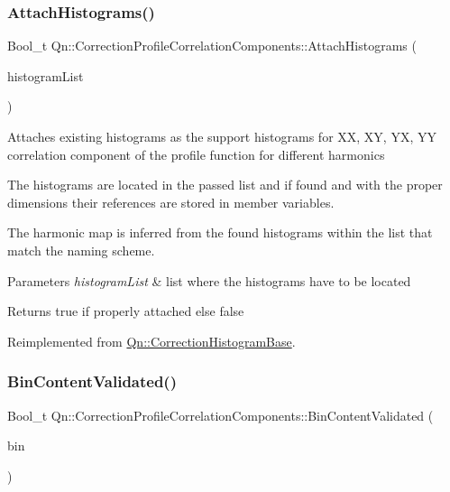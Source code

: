 \subsubsection{\texorpdfstring{Attach\+Histograms()}{AttachHistograms()}}
{\footnotesize\ttfamily Bool\+\_\+t Qn\+::\+Correction\+Profile\+Correlation\+Components\+::\+Attach\+Histograms (\begin{DoxyParamCaption}\item[{T\+List $\ast$}]{histogram\+List }\end{DoxyParamCaption})\hspace{0.3cm}{\ttfamily [virtual]}}

Attaches existing histograms as the support histograms for XX, XY, YX, YY correlation component of the profile function for different harmonics

The histograms are located in the passed list and if found and with the proper dimensions their references are stored in member variables.

The harmonic map is inferred from the found histograms within the list that match the naming scheme.


\begin{DoxyParams}{Parameters}
{\em histogram\+List} & list where the histograms have to be located \\
\hline
\end{DoxyParams}
\begin{DoxyReturn}{Returns}
true if properly attached else false 
\end{DoxyReturn}


Reimplemented from \mbox{\hyperlink{classQn_1_1CorrectionHistogramBase_ad8bcd0079fe5db561780a522e46b7b16}{Qn\+::\+Correction\+Histogram\+Base}}.

\mbox{\label{classQn_1_1CorrectionProfileCorrelationComponents_a10db27a0f3bc8c52b3b188eb7395f835}} 
\subsubsection{\texorpdfstring{Bin\+Content\+Validated()}{BinContentValidated()}}
{\footnotesize\ttfamily Bool\+\_\+t Qn\+::\+Correction\+Profile\+Correlation\+Components\+::\+Bin\+Content\+Validated (\begin{DoxyParamCaption}\item[{Long64\+\_\+t}]{bin }\end{DoxyParamCaption})\hspace{0.3cm}{\ttfamily [virtual]}}

